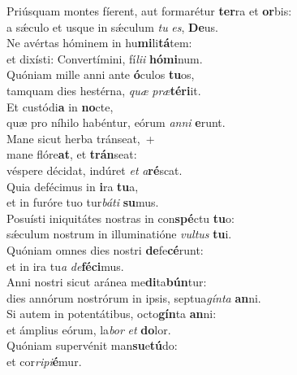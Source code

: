 \evenverse Priúsquam montes fíerent, aut formarétur \textbf{ter}ra et \textbf{or}bis:~\*\\
\evenverse a sǽculo et usque in sǽculum \textit{tu} \textit{es}, \textbf{De}us.\\
\oddverse Ne avértas hóminem in hu\textbf{mi}li\textbf{tá}tem:~\*\\
\oddverse et dixísti: Convertímini, fí\textit{li}\textit{i} \textbf{hó}\textbf{mi}num.\\
\evenverse Quóniam mille anni ante \textbf{ó}culos \textbf{tu}os,~\*\\
\evenverse tamquam dies hestérna, \textit{quæ} \textit{præ}\textbf{té}\textbf{ri}it.\\
\oddverse Et custódi\textbf{a} in \textbf{no}cte,~\*\\
\oddverse quæ pro níhilo habéntur, eórum \textit{an}\textit{ni} \textbf{e}runt.\\
\evenverse Mane sicut herba tránseat,~+\\
\evenverse  mane flóre\textbf{at}, et \textbf{trán}seat:~\*\\
\evenverse véspere décidat, indúret \textit{et} \textit{a}\textbf{ré}scat.\\
\oddverse Quia defécimus in \textbf{i}ra \textbf{tu}a,~\*\\
\oddverse et in furóre tuo tur\textit{bá}\textit{ti} \textbf{su}mus.\\
\evenverse Posuísti iniquitátes nostras in con\textbf{spé}ctu \textbf{tu}o:~\*\\
\evenverse sǽculum nostrum in illuminatióne \textit{vul}\textit{tus} \textbf{tu}i.\\
\oddverse Quóniam omnes dies nostri \textbf{de}fe\textbf{cé}runt:~\*\\
\oddverse et in ira tu\textit{a} \textit{de}\textbf{fé}\textbf{ci}mus.\\
\evenverse Anni nostri sicut aránea me\textbf{di}ta\textbf{bún}tur:~\*\\
\evenverse dies annórum nostrórum in ipsis, septua\textit{gín}\textit{ta} \textbf{an}ni.\\
\oddverse Si autem in potentátibus, octo\textbf{gín}ta \textbf{an}ni:~\*\\
\oddverse et ámplius eórum, la\textit{bor} \textit{et} \textbf{do}lor.\\
\evenverse Quóniam supervénit man\textbf{su}e\textbf{tú}do:~\*\\
\evenverse et cor\textit{ri}\textit{pi}\textbf{é}mur.\\
